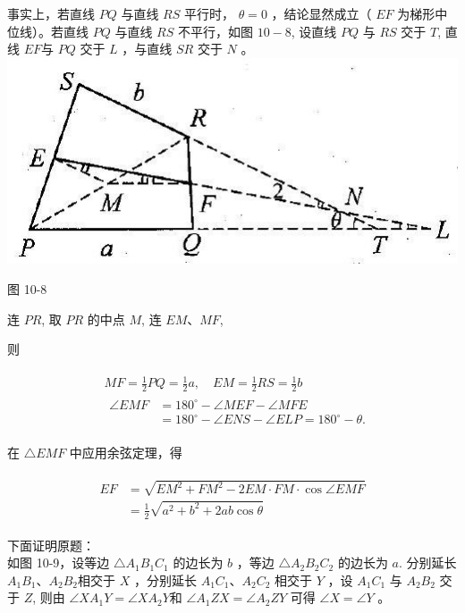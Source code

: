\documentclass[10pt]{article}
\begin{document}
事实上，若直线 $P Q$ 与直线 $R S$ 平行时， $\theta=0$ ，结论显然成立（ $E F$ 为梯形中位线）。若直线 $P Q$ 与直线 $R S$ 不平行，如图 $10-8$, 设直线 $P Q$ 与 $R S$ 交于 $T$, 直线 $E F$与 $P Q$ 交于 $L$ ，与直线 $S R$ 交于 $N$ 。\\
\includegraphics[max width=\textwidth, center]{2024_10_30_2c8f45efd4a519b08e1ag-098}

图 10-8

连 $P R$, 取 $P R$ 的中点 $M$, 连 $E M 、 M F$,

则

\begin{align*}
\begin{aligned}
& M F=\frac{1}{2} P Q=\frac{1}{2} a, \quad E M=\frac{1}{2} R S=\frac{1}{2} b \\
& \begin{aligned}
\angle E M F & =180^{\circ}-\angle M E F-\angle M F E \\
& =180^{\circ}-\angle E N S-\angle E L P=180^{\circ}-\theta .
\end{aligned}
\end{aligned}
\end{align*}

在 $\triangle E M F$ 中应用余弦定理，得

\begin{align*}
\begin{aligned}
E F & =\sqrt{E M^{2}+F M^{2}-2 E M \cdot F M \cdot \cos \angle E M F} \\
& =\frac{1}{2} \sqrt{a^{2}+b^{2}+2 a b \cos \theta}
\end{aligned}
\end{align*}

下面证明原题：\\
如图 10-9，设等边 $\triangle A_{1} B_{1} C_{1}$ 的边长为 $b$ ，等边 $\triangle A_{2} B_{2} C_{2}$ 的边长为 $a$. 分别延长 $A_{1} B_{1} 、 A_{2} B_{2}$相交于 $X$ ，分别延长 $A_{1} C_{1} 、 A_{2} C_{2}$ 相交于 $Y$ ，设 $A_{1} C_{1}$ 与 $A_{2} B_{2}$ 交于 $Z$, 则由 $\angle X A_{1} Y=\angle X A_{2} Y$和 $\angle A_{1} Z X=\angle A_{2} Z Y$ 可得 $\angle X=\angle Y$ 。
\end{document}
